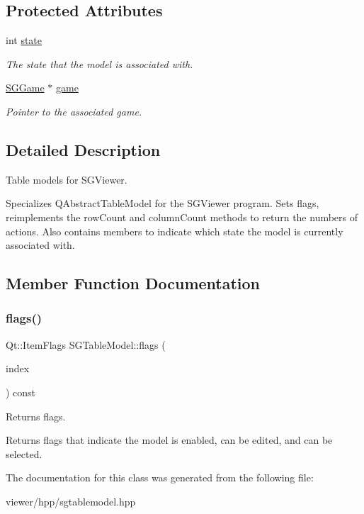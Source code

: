 \subsection*{Protected Attributes}
\begin{DoxyCompactItemize}
\item 
\mbox{\label{classSGTableModel_a6a74c2e062d9053ba90c07e916e7b2f6}} 
int \hyperlink{classSGTableModel_a6a74c2e062d9053ba90c07e916e7b2f6}{state}
\begin{DoxyCompactList}\small\item\em The state that the model is associated with. \end{DoxyCompactList}\item 
\mbox{\label{classSGTableModel_ace1b0551b82c669c334d2bc5c6be118a}} 
\hyperlink{classSGGame}{S\+G\+Game} $\ast$ \hyperlink{classSGTableModel_ace1b0551b82c669c334d2bc5c6be118a}{game}
\begin{DoxyCompactList}\small\item\em Pointer to the associated game. \end{DoxyCompactList}\end{DoxyCompactItemize}


\subsection{Detailed Description}
Table models for S\+G\+Viewer. 

Specializes Q\+Abstract\+Table\+Model for the S\+G\+Viewer program. Sets flags, reimplements the row\+Count and column\+Count methods to return the numbers of actions. Also contains members to indicate which state the model is currently associated with. 

\subsection{Member Function Documentation}
\mbox{\label{classSGTableModel_aa0a7a0d77e74ce1f799b52a1dc5fc9d6}} 
\subsubsection{\texorpdfstring{flags()}{flags()}}
{\footnotesize\ttfamily Qt\+::\+Item\+Flags S\+G\+Table\+Model\+::flags (\begin{DoxyParamCaption}\item[{const Q\+Model\+Index \&}]{index }\end{DoxyParamCaption}) const\hspace{0.3cm}{\ttfamily [inline]}}



Returns flags. 

Returns flags that indicate the model is enabled, can be edited, and can be selected. 

The documentation for this class was generated from the following file\+:\begin{DoxyCompactItemize}
\item 
viewer/hpp/sgtablemodel.\+hpp\end{DoxyCompactItemize}
